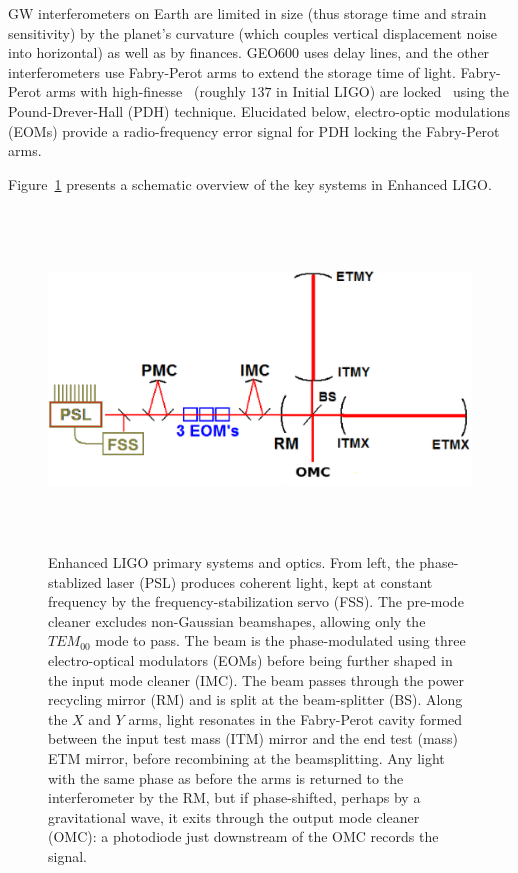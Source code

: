 
GW interferometers on Earth are limited in size (thus storage time and strain sensitivity) by the planet's curvature (which couples vertical displacement noise into horizontal) as well as by finances. 
GEO600 uses delay lines, and the other interferometers use Fabry-Perot arms to extend the storage time of light.
Fabry-Perot arms with high-finesse~\cite{ResonanceFP,ResponsesFP} (roughly $137$ in Initial LIGO) are locked~\cite{PDHNotes} using the Pound-Drever-Hall (PDH) technique.
Elucidated below, electro-optic modulations (EOMs) provide a radio-frequency error signal for PDH locking the Fabry-Perot arms.

Figure~\ref{primary_eLIGO_optics} presents a schematic overview of the key systems in Enhanced LIGO.

\begin{figure}
\begin{center}
\includegraphics[height=90mm,width=148mm]{LIGODiagramnew.eps}
\caption{Enhanced LIGO primary systems and optics. From left, the phase-stablized laser (PSL) produces coherent light, kept at constant frequency by the frequency-stabilization servo (FSS). The pre-mode cleaner excludes non-Gaussian beamshapes, allowing only the $TEM_{00}$ mode to pass. The beam is the phase-modulated using three electro-optical modulators (EOMs) before being further shaped in the input mode cleaner (IMC). The beam passes through the power recycling mirror (RM) and is split at the beam-splitter (BS). Along the $X$ and $Y$ arms, light resonates in the Fabry-Perot cavity formed between the input test mass (ITM) mirror and the end test (mass) ETM mirror, before recombining at the beamsplitting. Any light with the same phase as before the arms is returned to the interferometer by the RM, but if phase-shifted, perhaps by a gravitational wave, it exits through the output mode cleaner (OMC): a photodiode just downstream of the OMC records the signal.}
\label{primary_eLIGO_optics}
\end{center}
\end{figure}

